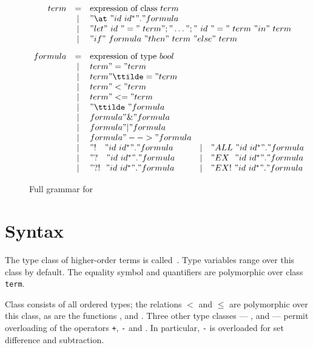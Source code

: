 \begin{figure}
\dquotes
\[\begin{array}{rclcl}
    term & = & \hbox{expression of class~$term$} \\
         & | & "\at~" id~id^* " . " formula \\
         & | & 
    \multicolumn{3}{l}{"let"~id~"="~term";"\dots";"~id~"="~term~"in"~term} \\
         & | & 
    \multicolumn{3}{l}{"if"~formula~"then"~term~"else"~term} \\[2ex]
 formula & = & \hbox{expression of type~$bool$} \\
         & | & term " = " term \\
         & | & term " \ttilde= " term \\
         & | & term " < " term \\
         & | & term " <= " term \\
         & | & "\ttilde\ " formula \\
         & | & formula " \& " formula \\
         & | & formula " | " formula \\
         & | & formula " --> " formula \\
         & | & "!~~~" id~id^* " . " formula 
         & | & "ALL~" id~id^* " . " formula \\
         & | & "?~~~" id~id^* " . " formula 
         & | & "EX~~" id~id^* " . " formula \\
         & | & "?!~~" id~id^* " . " formula 
         & | & "EX!~" id~id^* " . " formula
  \end{array}
\]
\caption{Full grammar for \HOL} \label{hol-grammar}
\end{figure} 


\section{Syntax}
The type class of higher-order terms is called~.  Type variables
range over this class by default.  The equality symbol and quantifiers are
polymorphic over class {\tt term}.

Class  consists of all ordered types; the relations $<$ and
$\leq$ are polymorphic over this class, as are the functions
,  and .  Three other
type classes --- ,  and  --- permit
overloading of the operators {\tt+}, {\tt-} and {\tt*}.  In particular,
{\tt-} is overloaded for set difference and subtraction.

